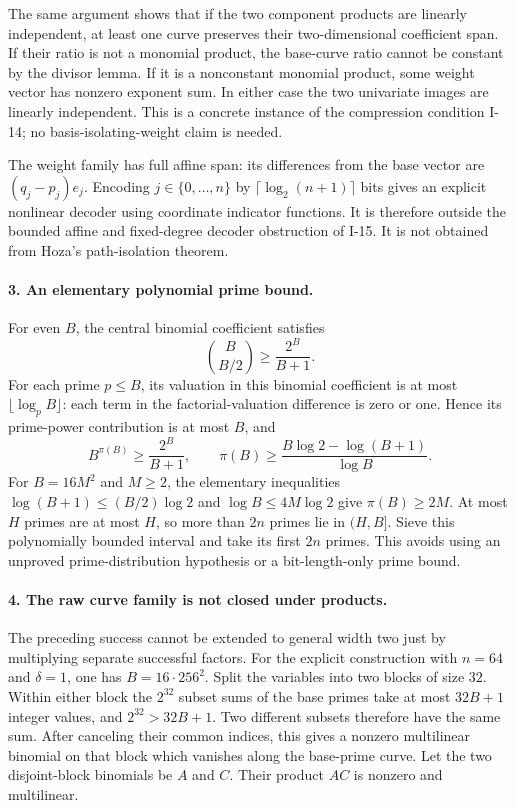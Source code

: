 \documentclass[11pt,a4paper]{article}
\theoremstyle{definition}\newtheorem{definition}{Definition}
\begin{document}
The same argument shows that if the two component products
are linearly independent, at least one curve preserves
their two-dimensional coefficient span.  If their ratio is
not a monomial product, the base-curve ratio cannot be
constant by the divisor lemma.  If it is a nonconstant
monomial product, some weight vector has nonzero exponent
sum.  In either case the two univariate images are linearly
independent.  This is a concrete instance of the compression
condition I-14; no basis-isolating-weight claim is needed.

The weight family has full affine span: its differences
from the base vector are $(q_j-p_j)e_j$.  Encoding
$j\in\{0,\ldots,n\}$ by $\lceil\log_2(n+1)\rceil$ bits
gives an explicit nonlinear decoder using coordinate
indicator functions.  It is therefore outside the bounded
affine and fixed-degree decoder obstruction of I-15.
It is not obtained from Hoza's path-isolation theorem.

\paragraph{3. An elementary polynomial prime bound.}
For even $B$, the central binomial coefficient satisfies
\[
 \binom{B}{B/2}\ge\frac{2^B}{B+1}.
\]
For each prime $p\le B$, its valuation in this binomial
coefficient is at most $\lfloor\log_p B\rfloor$: each
term in the factorial-valuation difference is zero or one.
Hence its prime-power contribution is at most $B$, and
\[
 B^{\pi(B)}\ge\frac{2^B}{B+1},\qquad
 \pi(B)\ge\frac{B\log2-\log(B+1)}{\log B}.
\]
For $B=16M^2$ and $M\ge2$, the elementary inequalities
$\log(B+1)\le(B/2)\log2$ and $\log B\le4M\log2$
give $\pi(B)\ge2M$.  At most $H$ primes are at most $H$,
so more than $2n$ primes lie in $(H,B]$.
Sieve this polynomially bounded interval and take its first
$2n$ primes.  This avoids using an unproved prime-distribution
hypothesis or a bit-length-only prime bound.

\paragraph{4. The raw curve family is not closed under products.}
The preceding success cannot be extended to general width
two just by multiplying separate successful factors.
For the explicit construction with $n=64$ and $\delta=1$,
one has $B=16\cdot256^2$.  Split the variables into two
blocks of size $32$.  Within either block the $2^{32}$
subset sums of the base primes take at most $32B+1$
integer values, and $2^{32}>32B+1$.  Two different subsets
therefore have the same sum.  After canceling their common
indices, this gives a nonzero multilinear binomial on that
block which vanishes along the base-prime curve.
Let the two disjoint-block binomials be $A$ and $C$.
Their product $AC$ is nonzero and multilinear.
\end{document}

